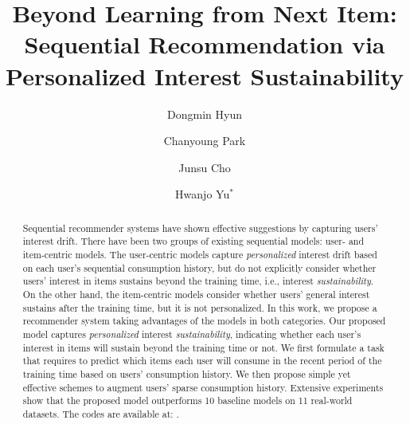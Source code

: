 \documentclass[sigconf]{acmart}
\begin{document}
\title{Beyond Learning from Next Item: Sequential Recommendation via Personalized Interest Sustainability}




\author{Dongmin Hyun}

\author{Chanyoung Park}

\author{Junsu Cho}

\author{Hwanjo Yu$^*$}


\renewcommand{\shortauthors}{Dongmin Hyun, Chanyoung Park, Junsu Cho, and Hwanjo Yu}



\begin{abstract} 
Sequential recommender systems have shown effective suggestions by capturing users' interest drift. 
There have been two groups of existing sequential models: user- and item-centric models.
The user-centric models capture \textit{personalized} interest drift based on each user's sequential consumption history, but do not explicitly consider whether users’ interest in items sustains beyond the training time, i.e., interest \textit{sustainability}. On the other hand, the item-centric models consider whether users’ general interest sustains after the training time,
but it is not personalized. 
In this work, we propose a recommender system taking advantages of the models in both categories. Our proposed model captures \textit{personalized} interest \textit{sustainability}, indicating whether each user’s interest in items will sustain beyond the training time or not. 
We first formulate a task that requires to predict which items each user will consume in the recent period of the training time based on users' consumption history.
We then propose simple yet effective schemes to augment users' sparse consumption history. 
Extensive experiments show that the proposed model outperforms 10 baseline models on 11 real-world datasets. The codes are available at: \href{https://github.com/dmhyun/PERIS}{\color{magenta}{https://github.com/dmhyun/PERIS}}.
\end{abstract}
\end{document}
